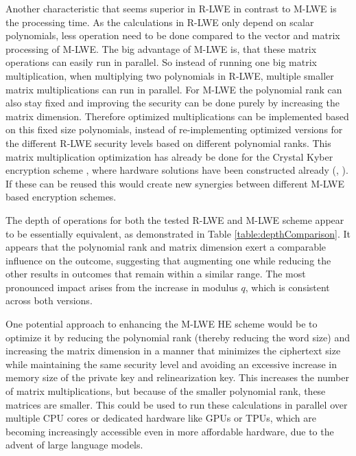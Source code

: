 Another characteristic that seems superior in R-LWE in contrast to M-LWE is the processing time. As the calculations in R-LWE only depend on scalar polynomials, less operation need to be done compared to the vector and matrix processing of M-LWE. The big advantage of M-LWE is, that these matrix operations can easily run in parallel. So instead of running one big matrix multiplication, when multiplying two polynomials in R-LWE, multiple smaller matrix multiplications can run in parallel. For M-LWE the polynomial rank can also stay fixed and improving the security can be done purely by increasing the matrix dimension. Therefore optimized multiplications can be implemented based on this fixed size polynomials, instead of re-implementing optimized versions for the different R-LWE security levels based on different polynomial ranks. This matrix multiplication optimization has already be done for the Crystal Kyber encryption scheme \cite{CyrstalsKyber}, where hardware solutions have been constructed already (\cite{KyberHardware}, \cite{KyberHardware2}). If these can be reused this would create new synergies between different M-LWE based encryption schemes.

The depth of operations for both the tested R-LWE and M-LWE scheme appear to be essentially equivalent, as demonstrated in Table \ref{table:depthComparison}. It appears that the polynomial rank and matrix dimension exert a comparable influence on the outcome, suggesting that augmenting one while reducing the other results in outcomes that remain within a similar range. The most pronounced impact arises from the increase in modulus $q$, which is consistent across both versions.

One potential approach to enhancing the M-LWE HE scheme would be to optimize it by reducing the polynomial rank (thereby reducing the word size) and increasing the matrix dimension in a manner that minimizes the ciphertext size while maintaining the same security level and avoiding an excessive increase in memory size of the private key and relinearization key. This increases the number of matrix multiplications, but because of the smaller polynomial rank, these matrices are smaller. This could be used to run these calculations in parallel over multiple CPU cores or dedicated hardware like GPUs or TPUs, which are becoming increasingly accessible even in more affordable hardware, due to the advent of large language models.





